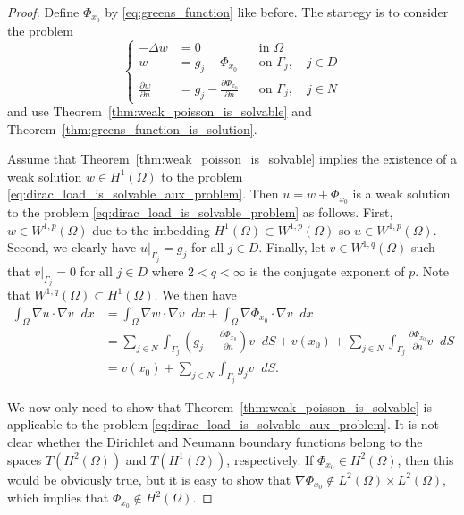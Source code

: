 \documentclass[english, 12pt, a4paper, sci, utf8, a-2b, online]{aaltothesis}
\theoremstyle{definition}
\theoremstyle{plain}
\newcommand*\diff{\mathop{}\!d}
\numberwithin{equation}{section}
\begin{document}
\begin{proof}
    Define $\Phi_{x_0}$ by \eqref{eq:greens_function} like before.
    The startegy is to consider the problem
    \begin{equation}
        \label{eq:dirac_load_is_solvable_aux_problem}
        \left\{
            \begin{aligned}
                -\Delta w &= 0 && \text{in } \Omega \\
                w &= g_j - \Phi_{x_0} && \text{on } \Gamma_j, \quad j \in D \\
                \frac{\partial w}{\partial n} &=
                    g_j - \frac{\partial \Phi_{x_0}}{\partial n}
                        && \text{on } \Gamma_j, \quad j \in N
            \end{aligned}
        \right.
    \end{equation}
    and use Theorem~\ref{thm:weak_poisson_is_solvable} and
    Theorem~\ref{thm:greens_function_is_solution}.
    
    Assume that Theorem~\ref{thm:weak_poisson_is_solvable} implies the
    existence of a weak solution $w \in H^1(\Omega)$ to the problem
    \eqref{eq:dirac_load_is_solvable_aux_problem}.
    Then $u = w + \Phi_{x_0}$ is a weak solution to the problem
    \eqref{eq:dirac_load_is_solvable_problem} as follows.
    First, $w \in W^{1,p}(\Omega)$ due to the imbedding
    $H^1(\Omega) \subset W^{1,p}(\Omega)$ so $u \in W^{1,p}(\Omega)$.
    Second, we clearly have $u|_{\Gamma_j} = g_j$ for all $j \in D$.
    Finally, let $v \in W^{1,q}(\Omega)$ such that $v|_{\Gamma_j} = 0$
    for all $j \in D$ where $2 < q < \infty$ is the conjugate exponent of $p$.
    Note that $W^{1,q}(\Omega) \subset H^1(\Omega)$. We then have
    \begin{align*}
        \int_{\Omega} \nabla u \cdot \nabla v \diff x
        &= \int_{\Omega} \nabla w \cdot \nabla v \diff x
            + \int_{\Omega} \nabla \Phi_{x_0} \cdot \nabla v \diff x \\
        &= \sum_{j \in N} \int_{\Gamma_j}
            \left( g_j - \frac{\partial \Phi_{x_0}}{\partial n} \right) v \diff S
            + v(x_0)
            + \sum_{j \in N} \int_{\Gamma_j}
                \frac{\partial \Phi_{x_0}}{\partial n} v \diff S \\
        &= v(x_0) + \sum_{j \in N} \int_{\Gamma_j} g_j v \diff S.
    \end{align*}

    We now only need to show that Theorem~\ref{thm:weak_poisson_is_solvable}
    is applicable to the problem \eqref{eq:dirac_load_is_solvable_aux_problem}.
    It is not clear whether the Dirichlet and Neumann boundary functions
    belong to the spaces $T(H^2(\Omega))$ and $T(H^1(\Omega))$, respectively.
    If $\Phi_{x_0} \in H^2(\Omega)$, then this would be obviously true,
    but it is easy to show that
    $\nabla \Phi_{x_0} \notin L^2(\Omega) \times L^2(\Omega)$, which implies
    that $\Phi_{x_0} \notin H^2(\Omega)$.
    

\end{proof}
\end{document}
